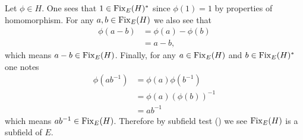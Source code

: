 \begin{questions}
    \item Let $\phi \in H$. One sees that $1 \in \mathrm{Fix}_{E}(H)^\ast$ since $\phi(1) = 1$ by properties of homomorphism. For any $a, b \in \mathrm{Fix}_{E}(H)$ we also see that
    \begin{align*}
        \phi(a - b) &= \phi(a) - \phi(b)\\
        &= a - b,
    \end{align*}
    which means $a - b \in \mathrm{Fix}_{E}(H)$. Finally, for any $a \in \mathrm{Fix}_{E}(H)$ and $b \in \mathrm{Fix}_{E}(H)^\ast$ one notes
    \begin{align*}
        \phi(ab^{-1}) &= \phi(a)\phi(b^{-1})\\
        &= \phi(a)\left(\phi(b)\right)^{-1}\\
        &= ab^{-1}
    \end{align*}
    which means $ab^{-1} \in \mathrm{Fix}_{E}(H)$. Therefore by subfield test () we see $\mathrm{Fix}_{E}(H)$ is a subfield of $E$.
\end{questions}
